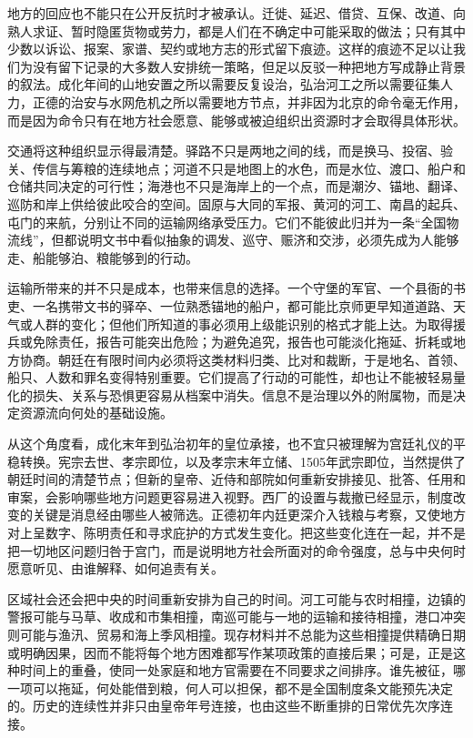 地方的回应也不能只在公开反抗时才被承认。迁徙、延迟、借贷、互保、改道、向熟人求证、暂时隐匿货物或劳力，都是人们在不确定中可能采取的做法；只有其中少数以诉讼、报案、家谱、契约或地方志的形式留下痕迹。这样的痕迹不足以让我们为没有留下记录的大多数人安排统一策略，但足以反驳一种把地方写成静止背景的叙法。成化年间的山地安置之所以需要反复设治，弘治河工之所以需要征集人力，正德的治安与水网危机之所以需要地方节点，并非因为北京的命令毫无作用，而是因为命令只有在地方社会愿意、能够或被迫组织出资源时才会取得具体形状。

交通将这种组织显示得最清楚。驿路不只是两地之间的线，而是换马、投宿、验关、传信与筹粮的连续地点；河道不只是地图上的水色，而是水位、渡口、船户和仓储共同决定的可行性；海港也不只是海岸上的一个点，而是潮汐、锚地、翻译、巡防和岸上供给彼此咬合的空间。固原与大同的军报、黄河的河工、南昌的起兵、屯门的来航，分别让不同的运输网络承受压力。它们不能彼此归并为一条“全国物流线”，但都说明文书中看似抽象的调发、巡守、赈济和交涉，必须先成为人能够走、船能够泊、粮能够到的行动。

运输所带来的并不只是成本，也带来信息的选择。一个守堡的军官、一个县衙的书吏、一名携带文书的驿卒、一位熟悉锚地的船户，都可能比京师更早知道道路、天气或人群的变化；但他们所知道的事必须用上级能识别的格式才能上达。为取得援兵或免除责任，报告可能突出危险；为避免追究，报告也可能淡化拖延、折耗或地方协商。朝廷在有限时间内必须将这类材料归类、比对和裁断，于是地名、首领、船只、人数和罪名变得特别重要。它们提高了行动的可能性，却也让不能被轻易量化的损失、关系与恐惧更容易从档案中消失。信息不是治理以外的附属物，而是决定资源流向何处的基础设施。

从这个角度看，成化末年到弘治初年的皇位承接，也不宜只被理解为宫廷礼仪的平稳转换。宪宗去世、孝宗即位，以及孝宗末年立储、1505年武宗即位，当然提供了朝廷时间的清楚节点；但新的皇帝、近侍和部院如何重新安排接见、批答、任用和审案，会影响哪些地方问题更容易进入视野。西厂的设置与裁撤已经显示，制度改变的关键是消息经由哪些人被筛选。正德初年内廷更深介入钱粮与考察，又使地方对上呈数字、陈明责任和寻求庇护的方式发生变化。把这些变化连在一起，并不是把一切地区问题归咎于宫门，而是说明地方社会所面对的命令强度，总与中央何时愿意听见、由谁解释、如何追责有关。

区域社会还会把中央的时间重新安排为自己的时间。河工可能与农时相撞，边镇的警报可能与马草、收成和市集相撞，南巡可能与一地的运输和接待相撞，港口冲突则可能与渔汛、贸易和海上季风相撞。现存材料并不总能为这些相撞提供精确日期或明确因果，因而不能将每个地方困难都写作某项政策的直接后果；可是，正是这种时间上的重叠，使同一处家庭和地方官需要在不同要求之间排序。谁先被征，哪一项可以拖延，何处能借到粮，何人可以担保，都不是全国制度条文能预先决定的。历史的连续性并非只由皇帝年号连接，也由这些不断重排的日常优先次序连接。

